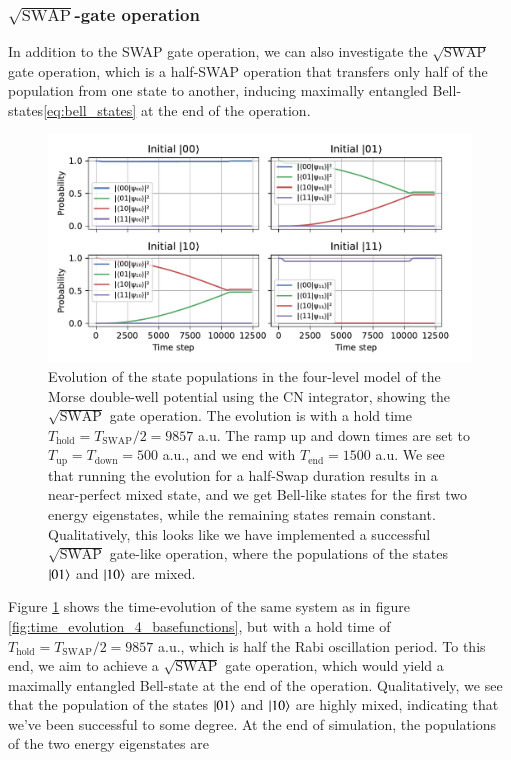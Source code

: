 \documentclass{subfiles}
\begin{document}
\subsubsection*{$\sqrt{\text{SWAP}}$-gate operation}
In addition to the SWAP gate operation, we can also investigate the $\sqrt{\text{SWAP}}$ gate operation, which is a half-SWAP operation that transfers only half of the population from one state to another, inducing maximally entangled Bell-states\eqref{eq:bell_states} at the end of the operation. 
\begin{figure}[h!]
    \centering
    \includegraphics[width=1.0\textwidth]{figs/time_evolution_4_basefunctions_2306_squareSWAP.pdf}
    \caption{Evolution of the state populations in the four-level model of the Morse double-well potential using the CN integrator, showing the $\sqrt{\text{SWAP}}$ gate operation. The evolution is with a hold time $T_{\text{hold}} = T_{\text{SWAP}}/2 = 9857$ a.u. The ramp up and down times are set to $T_{\text{up}} = T_{\text{down}} = 500$ a.u., and we end with $T_{\text{end}} = 1500$ a.u. We see that running the evolution for a half-Swap duration results in a near-perfect mixed state, and we get Bell-like states for the first two energy eigenstates, while the remaining states remain constant. Qualitatively, this looks like we have implemented a successful $\sqrt{\text{SWAP}}$ gate-like operation, where the populations of the states $\ket{01}$ and $\ket{10}$ are mixed.}
    \label{fig:time_evolution_4_basefunctions_sqrtSWAP}
\end{figure}
Figure \ref{fig:time_evolution_4_basefunctions_sqrtSWAP} shows the time-evolution of the same system as in figure \ref{fig:time_evolution_4_basefunctions}, but with a hold time of $T_{\text{hold}} = T_{\text{SWAP}}/2 = 9857$ a.u., which is half the Rabi oscillation period. To this end, we aim to achieve a $\sqrt{\text{SWAP}}$ gate operation, which would yield a maximally entangled Bell-state at the end of the operation. Qualitatively, we see that the population of the states $\ket{01}$ and $\ket{10}$ are highly mixed, indicating that we've been successful to some degree. At the end of simulation, the populations of the two energy eigenstates are
\end{document}
